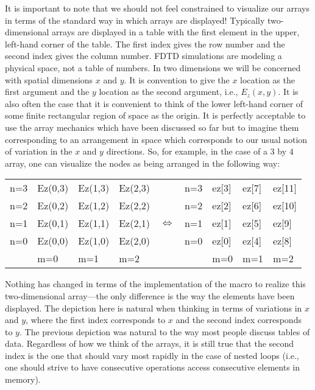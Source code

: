It is important to note that we should not feel constrained to
visualize our arrays in terms of the standard way in which arrays are
displayed!  Typically two-dimensional arrays are displayed in a table
with the first element in the upper, left-hand corner of the table.
The first index gives the row number and the second index gives the
column number.  FDTD simulations are modeling a physical space, not a
table of numbers.  In two dimensions we will be concerned with spatial
dimensions $x$ and $y$.  It is convention to give the $x$ location as
the first argument and the $y$ location as the second argument, i.e.,
$E_z(x,y)$.  It is also often the case that it is convenient to think
of the lower left-hand corner of some finite rectangular region of
space as the origin.  It is perfectly acceptable to use the array
mechanics which have been discussed so far but to imagine them
corresponding to an arrangement in space which corresponds to our
usual notion of variation in the $x$ and $y$ directions.  So, for
example, in the case of a $3$ by $4$ array, one can visualize the
nodes as being arranged in the following way:
\begin{center}
\begin{tabular}{l|lllll|lll}
n=3 &Ez(0,3) & Ez(1,3) & Ez(2,3) &&
       n=3   &ez[3]&ez[7]&ez[11]\\
n=2 &Ez(0,2) & Ez(1,2) & Ez(2,2) &&
       n=2   &ez[2]&ez[6]&ez[10]\\
n=1 &Ez(0,1) & Ez(1,1) & Ez(2,1) &
\hspace{.2in}$\Longleftrightarrow$\hspace{.2in}\mbox{}&
       n=1   &ez[1]&ez[5]&ez[9]\\
n=0 &Ez(0,0) & Ez(1,0) & Ez(2,0) &&
       n=0   &ez[0]&ez[4]&ez[8]\\\cline{1-4}\cline{6-9}
    &m=0     & m=1     & m=2     &&
             &m=0  &m=1  &m=2  \\
\end{tabular}
\end{center}
Nothing has changed in terms of the implementation of the macro to
realize this two-dimensional array---the only difference is the way
the elements have been displayed.  The depiction here is natural when
thinking in terms of variations in $x$ and $y$, where the first index
corresponds to $x$ and the second index corresponds to $y$.  The
previous depiction was natural to the way most people discuss tables
of data.  Regardless of how we think of the arrays, it is still true
that the second index is the one that should vary most rapidly in the
case of nested loops (i.e., one should strive to have consecutive
operations access consecutive elements in memory).

